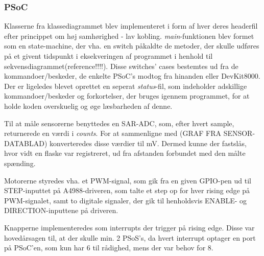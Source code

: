 \subsubsection{PSoC}
Klasserne fra klassediagrammet blev implementeret i form af hver deres headerfil efter princippet om høj samhørighed - lav kobling. \textit{main}-funktionen blev formet som en state-machine, der vha. en switch påkaldte de metoder, der skulle udføres på et givent tidspunkt i eksekveringen af programmet i henhold til sekvensdiagrammet(reference!!!!). Disse switches' cases bestemtes ud fra de kommandoer/beskeder, de enkelte PSoC's modtog fra hinanden eller DevKit8000. Der er ligeledes blevet oprettet en seperat \textit{status}-fil, som indeholder adskillige kommandoer/beskeder og forkortelser, der bruges igennem programmet, for at holde koden overskuelig og øge læsbarheden af denne.

Til at måle sensorerne benyttedes en SAR-ADC, som, efter hvert sample, returnerede en værdi i \textit{counts}. For at sammenligne med (GRAF FRA SENSOR-DATABLAD) konverteredes disse værdier til mV. Dermed kunne der fastslås, hvor vidt en flaske var registreret, ud fra afstanden forbundet med den målte spænding.

Motorerne styredes vha. et PWM-signal, som gik fra en given GPIO-pen ud til STEP-inputtet på A4988-driveren, som talte et step op for hver rising edge på PWM-signalet, samt to digitale signaler, der gik til henholdsvis ENABLE- og DIRECTION-inputtene på driveren.

Knapperne implementeredes som interrupts der trigger på rising edge. Disse var hovedårsagen til, at der skulle min. 2 PSoS's, da hvert interrupt optager en port på PSoC'en, som kun har 6 til rådighed, mens der var behov for 8.
